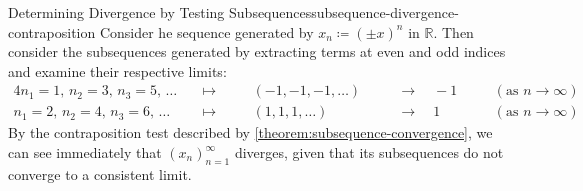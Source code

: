 \documentclass{article}
\numberwithin{equation}{section}
\numberwithin{figure}{section}
\begin{document}
\begin{example}{Determining Divergence by Testing
        Subsequences}{subsequence-divergence-contraposition}
    Consider he sequence generated by $ x_n \coloneq \left( \pm x \right)^n $ in
    $ \mathbb{R} $. Then consider the subsequences generated by extracting terms
    at even and odd indices and examine their respective limits:
    \begin{alignat}{4}
        n_1 = 1,\, n_2 = 3,\, n_3 = 5,\, \ldots & \quad\mapsto\quad &&
            (-1, -1, -1, \ldots) && \quad\to\quad -1 && \quad(\text{as } n \to
            \infty) \\
        n_1 = 2,\, n_2 = 4,\, n_3 = 6,\, \ldots & \quad\mapsto\quad &&
            (1, 1, 1, \ldots) && \quad\to\quad 1 && \quad(\text{as } n \to
            \infty)
    \end{alignat}
    By the contraposition test described by
    \cref{theorem:subsequence-convergence}, we can see immediately that $ \left(
    x_n \right)_{n=1}^\infty $ diverges, given that its subsequences do not
    converge to a consistent limit.
\end{example}
\end{document}
